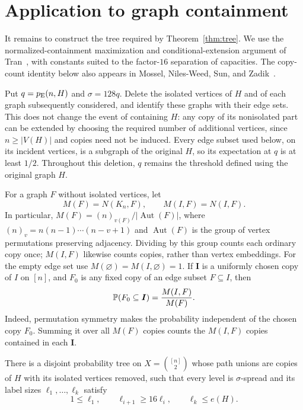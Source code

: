 \section{Application to graph containment}\label{sec:graphs}

It remains to construct the tree required by Theorem~\ref{thm:tree}.
We use the normalized-containment maximization and conditional-extension
argument of Tran~\cite[Section~3, Lemma~3.1]{Tran26}, with constants suited
to the factor-$16$ separation of capacities. The copy-count identity below
also appears in Mossel, Niles-Weed, Sun, and Zadik~\cite[Equation~(5)]{MNSZ22}.

Put $q=p_{\mathrm E}(n,H)$ and $\sigma=128q$. Delete the isolated vertices of $H$
and of each graph subsequently considered, and identify these graphs
with their edge sets. This does not change the event of containing
$H$: any copy of its nonisolated part can be extended by choosing the
required number of additional vertices, since $n\ge|V(H)|$ and
copies need not be induced. Every edge subset used below, on its
incident vertices, is a subgraph of the original $H$, so its
expectation at $q$ is at least $1/2$.
Throughout this deletion, $q$ remains the threshold defined using the
original graph $H$.

For a graph $F$ without isolated vertices, let
\[
 M(F)=N(K_n,F),\qquad M(I,F)=N(I,F).
\]
In particular, $M(F)=(n)_{v(F)}/|\operatorname{Aut}(F)|$, where
$(n)_v=n(n-1)\cdots(n-v+1)$ and $\operatorname{Aut}(F)$ is the group of
vertex permutations preserving adjacency. Dividing by this group counts
each ordinary copy once; $M(I,F)$ likewise counts copies, rather than
vertex embeddings.
For the empty edge set use $M(\varnothing)=M(I,\varnothing)=1$.
If $\boldsymbol I$ is a uniformly chosen copy of $I$ on $[n]$, and
$F_0$ is any fixed copy of an edge subset $F\subseteq I$, then
\begin{equation}\label{eq:copy-ratio}
 \mathbb P(F_0\subseteq\boldsymbol I)=\frac{M(I,F)}{M(F)}.
\end{equation}
Indeed, permutation symmetry makes the probability independent of
the chosen copy $F_0$. Summing it over all $M(F)$ copies counts the
$M(I,F)$ copies contained in each $\boldsymbol I$.

\begin{lemma}\label{lem:hierarchy}
There is a disjoint probability tree on
$X=\binom{[n]}2$ whose path unions are copies of $H$ with its isolated
vertices removed, such that every level is $\sigma$-spread and its label
sizes $\ell_1,\ldots,\ell_k$ satisfy
\[
 1\le\ell_1,\qquad \ell_{i+1}\ge16\ell_i,
 \qquad \ell_k\le e(H).
\]
\end{lemma}


